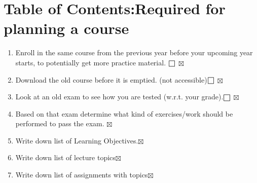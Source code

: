 \section*{Table of Contents:Required for planning a course}\label{sec:t1_neck}
\begin{enumerate}
    \setcounter{enumi}{0} 
    \item Enroll in the same course from the previous year before your upcoming year starts, to potentially get more practice material.  $\msquare$ $\boxtimes$
    \item Download the old course before it is emptied. (not accessible)$\msquare$ $\boxtimes$
    \item Look at an old exam to see how you are tested (w.r.t. your grade).$\msquare$ $\boxtimes$
    \item Based on that exam determine what kind of exercises/work should be performed to pass the exam. $\boxtimes$
    \item Write down list of Learning Objectives.$\boxtimes$
    \item Write down list of lecture topics$\boxtimes$
    \item Write down list of assignments with topics$\boxtimes$
    

\end{enumerate}
